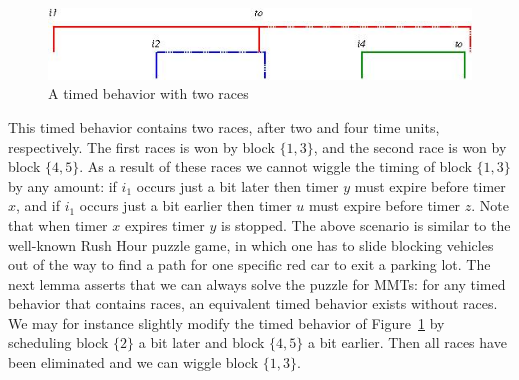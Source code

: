 \iflong
\begin{figure}
\vspace{-2em}
\begin{center}
\includegraphics[width=.8\textwidth]{wiggling.jpg}
\end{center}
\caption{A timed behavior with two races}
\label{fig:races}
\end{figure}
\fi
This timed behavior contains two races, after two and four time units, respectively.
The first races is won by block $\{ 1, 3 \}$, and the second race is won by block $\{ 4, 5 \}$.
As a result of these races we cannot wiggle the timing of block $\{ 1, 3 \}$ by any amount:
if $i_1$ occurs just a bit later then timer $y$ must expire before timer $x$,
and if $i_1$ occurs just a bit earlier then timer $u$ must expire before timer $z$.
Note that when timer $x$ expires timer $y$ is stopped.
%
The above scenario is similar to the well-known Rush Hour puzzle game,
in which one has to slide blocking vehicles out of the way to find a path for one specific red car to exit a parking lot.
The next lemma asserts that we can always solve the puzzle for MMTs: for any timed behavior that contains races,
an equivalent timed behavior exists without races.
We may for instance slightly modify the timed behavior
\iflong
of Figure~\ref{fig:races} 
\fi
by scheduling block $\{ 2  \}$
a bit later and block $\{ 4, 5 \}$ a bit earlier.
Then all races have been eliminated and we can wiggle block $\{ 1, 3 \}$.


